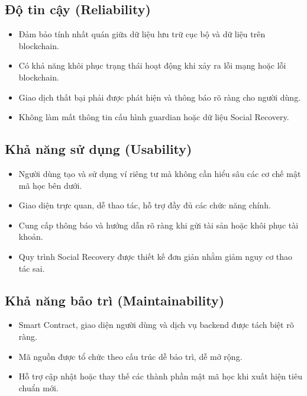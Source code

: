 \documentclass[../DoAn.tex]{subfiles}
\begin{document}
\subsection{Độ tin cậy (Reliability)}

\begin{itemize}
\item Đảm bảo tính nhất quán giữa dữ liệu lưu trữ cục bộ và dữ liệu trên blockchain.
\item Có khả năng khôi phục trạng thái hoạt động khi xảy ra lỗi mạng hoặc lỗi blockchain.
\item Giao dịch thất bại phải được phát hiện và thông báo rõ ràng cho người dùng.
\item Không làm mất thông tin cấu hình guardian hoặc dữ liệu Social Recovery.
\end{itemize}

\subsection{Khả năng sử dụng (Usability)}

\begin{itemize}
\item Người dùng tạo và sử dụng ví riêng tư mà không cần hiểu sâu các cơ chế mật mã học bên dưới.
\item Giao diện trực quan, dễ thao tác, hỗ trợ đầy đủ các chức năng chính.
\item Cung cấp thông báo và hướng dẫn rõ ràng khi gửi tài sản hoặc khôi phục tài khoản.
\item Quy trình Social Recovery được thiết kế đơn giản nhằm giảm nguy cơ thao tác sai.
\end{itemize}

\subsection{Khả năng bảo trì (Maintainability)}

\begin{itemize}
\item Smart Contract, giao diện người dùng và dịch vụ backend được tách biệt rõ ràng.
\item Mã nguồn được tổ chức theo cấu trúc dễ bảo trì, dễ mở rộng.
\item Hỗ trợ cập nhật hoặc thay thế các thành phần mật mã học khi xuất hiện tiêu chuẩn mới.
\end{itemize}
\end{document}
